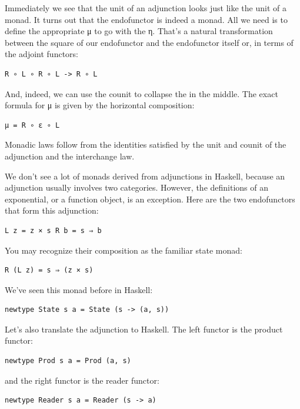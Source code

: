 Immediately we see that the unit of an adjunction looks just like the
unit of a monad. It turns out that the endofunctor  is
indeed a monad. All we need is to define the appropriate μ to go with
the η. That's a natural transformation between the square of our
endofunctor and the endofunctor itself or, in terms of the adjoint
functors:

\begin{verbatim}
R ∘ L ∘ R ∘ L -> R ∘ L
\end{verbatim}

And, indeed, we can use the counit to collapse the  in
the middle. The exact formula for μ is given by the horizontal
composition:

\begin{verbatim}
μ = R ∘ ε ∘ L
\end{verbatim}

Monadic laws follow from the identities satisfied by the unit and counit
of the adjunction and the interchange law.

We don't see a lot of monads derived from adjunctions in Haskell,
because an adjunction usually involves two categories. However, the
definitions of an exponential, or a function object, is an exception.
Here are the two endofunctors that form this adjunction:

\begin{verbatim}
L z = z × s R b = s ⇒ b
\end{verbatim}

You may recognize their composition as the familiar state monad:

\begin{verbatim}
R (L z) = s ⇒ (z × s)
\end{verbatim}

We've seen this monad before in Haskell:

\begin{verbatim}
newtype State s a = State (s -> (a, s))
\end{verbatim}

Let's also translate the adjunction to Haskell. The left functor is the
product functor:

\begin{verbatim}
newtype Prod s a = Prod (a, s)
\end{verbatim}

and the right functor is the reader functor:

\begin{verbatim}
newtype Reader s a = Reader (s -> a)
\end{verbatim}

